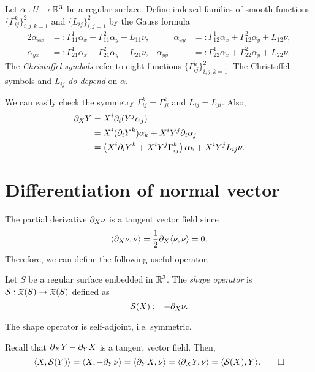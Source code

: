 \documentclass{../note}
\def\a{\alpha}
\begin{document}
\begin{defn}
Let $\a:U\to\R^3$ be a regular surface.
Define indexed families of smooth functions $\{\Gamma_{ij}^k\}_{i,j,k=1}^2$ and $\{L_{ij}\}_{i,j=1}^2$ by the Gauss formula
\begin{alignat*}{2}
\a_{xx}&=:\Gamma_{11}^1\a_x+\Gamma_{11}^2\a_y+L_{11}\nu,&\qquad
\a_{xy}&=:\Gamma_{12}^1\a_x+\Gamma_{12}^2\a_y+L_{12}\nu,\\
\a_{yx}&=:\Gamma_{21}^1\a_x+\Gamma_{21}^2\a_y+L_{21}\nu,&
\a_{yy}&=:\Gamma_{22}^1\a_x+\Gamma_{22}^2\a_y+L_{22}\nu.
\end{alignat*}
The \emph{Christoffel symbols} refer to eight functions $\{\Gamma_{ij}^k\}_{i,j,k=1}^2$.
The Christoffel symbols and $L_{ij}$ \emph{do depend} on $\a$.
\end{defn}
We can easily check the symmetry $\Gamma_{ij}^k=\Gamma_{ji}^k$ and $L_{ij}=L_{ji}$.
Also,
\begin{align*}
\pd_XY
&=X^i\pd_i(Y^j\a_j)\\
&=X^i(\pd_iY^k)\a_k+X^iY^j\pd_i\a_j\\
&=\left(X^i\pd_iY^k+X^iY^j\Gamma_{ij}^k\right)\a_k+X^iY^jL_{ij}\nu.
\end{align*}



\section{Differentiation of normal vector}

The partial derivative $\pd_X\nu$ is a tangent vector field since
\[\<\pd_X\nu,\nu\>=\frac12\pd_X\<\nu,\nu\>=0.\]
Therefore, we can define the following useful operator.
\begin{defn}
Let $S$ be a regular surface embedded in $\mathbb{R}^3$.
The \emph{shape operator} is $\mathcal{S}:\mathfrak{X}(S)\to\mathfrak{X}(S)$ defined as
\[\cS(X):=-\pd_X\nu.\]
\end{defn}
\begin{prop}
The shape operator is self-adjoint, i.e. symmetric.
\end{prop}
\begin{pf}
Recall that $\pd_XY-\pd_YX$ is a tangent vector field.
Then,
\[\<X,\cS(Y)\>=\<X,-\pd_Y\nu\>=\<\pd_YX,\nu\>=\<\pd_XY,\nu\>=\<\cS(X),Y\>.\qedhere\]
\end{pf}

\end{document}
